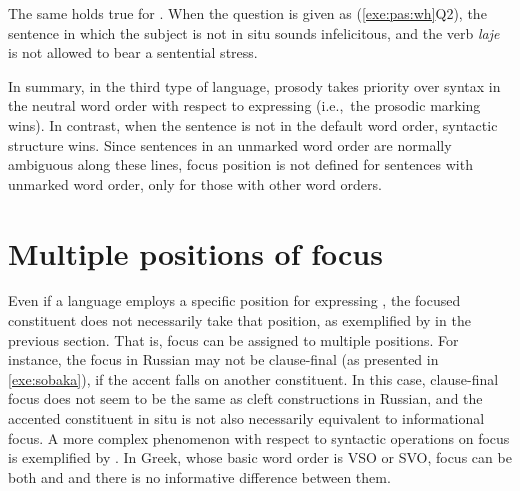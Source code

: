 The same holds true for .  When the
question is given as (\ref{exe:pas:wh}Q2), the sentence in which the
subject is not in situ sounds infelicitous, and the verb
\textit{laje} is not allowed to bear a sentential stress.



In summary, in the third type of language, prosody takes priority over
syntax in the neutral word order with respect to expressing 
(i.e.,\ the prosodic marking wins). In contrast, when the sentence is
not in the default word order, syntactic structure wins.  Since
sentences in an unmarked word order are normally ambiguous along these
lines, focus position is not defined for sentences with unmarked word
order, only for those with other word orders.



\section{Multiple positions of focus}
\label{5:sec:multiple}


Even if a language employs a specific position for expressing
, the focused constituent does not necessarily take that
position, as exemplified by  in the previous
section. That is, focus can be assigned to multiple
positions. For instance, the focus in Russian may not
be clause-final (as presented in \ref{exe:sobaka}), if the accent
falls on another constituent. In this case, clause-final focus does
not seem to be the same as cleft constructions in
Russian, and the accented constituent in situ is
not also necessarily equivalent to informational focus. A more complex
phenomenon with respect to syntactic operations on focus is
exemplified by  \citep{gryllia:09}. In Greek, whose basic
word order is VSO or SVO, focus can be both  and
 and there is no informative difference between them.


